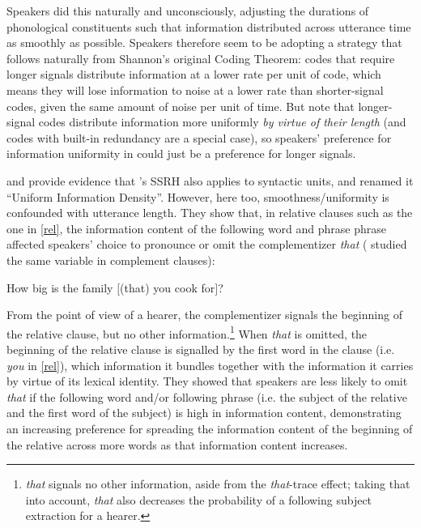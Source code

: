 \documentclass[12pt]{article}
\begin{document}
Speakers did this naturally and unconsciously, adjusting the durations of phonological constituents such that information distributed across utterance time as smoothly as possible. Speakers therefore seem to be adopting a strategy that follows naturally from Shannon's original Coding Theorem: codes that require longer signals distribute information at a lower rate per unit of code, which means they will lose information to noise at a lower rate than shorter-signal codes, given the same amount of noise per unit of time. But note that longer-signal codes distribute information more uniformly \textsl{by virtue of their length} (and codes with built-in redundancy are a special case), so speakers' preference for information uniformity in \citet{aylettturk2004} could just be a preference for longer signals.

\citet{levyjaeger2007} and \citet{jaeger2010} provide evidence that \citet{aylettturk2004}'s SSRH also applies to syntactic units, and renamed it ``Uniform Information Density''. However, here too, smoothness/uniformity is confounded with utterance length.  They show that, in relative clauses such as the one in \ref{rel}, the information content of the following word and phrase phrase affected speakers' choice to pronounce or omit the complementizer \textsl{that} (\citealt{jaeger2010} studied the same variable in complement clauses):

\begin{exe}
\ex \label{rel} How big is the family $[$(that) you cook for$]$?
\end{exe}

\noindent From the point of view of a hearer, the complementizer signals the beginning of the relative clause, but no other information.\footnote{\textsl{that} signals no other information, aside from the \textsl{that}-trace effect; taking that into account, \textsl{that} also decreases the probability of a following subject extraction for a hearer.} When \textsl{that} is omitted, the beginning of the relative clause is signalled by the first word in the clause (i.e. \textsl{you} in \ref{rel}), which information it bundles together with the information it carries by virtue of its lexical identity. They showed that speakers are less likely to omit \textsl{that} if the following word and/or following phrase (i.e. the subject of the relative and the first word of the subject) is high in information content, demonstrating an increasing preference for spreading the information content of the beginning of the relative across more words as that information content increases.
\end{document}
